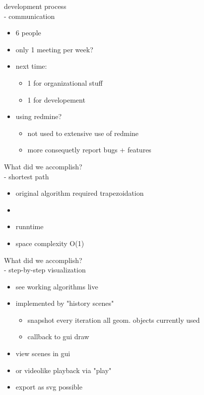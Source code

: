 \documentclass[ucs,9ptb]{beamer}
\begin{document}
\begin{frame}{development process\\- communication}
  \begin{itemize}
    \item 6 people
    \item only 1 meeting per week?
    \item next time:
    \begin{itemize}
      \item 1 for organizational stuff
      \item 1 for developement
    \end{itemize}
    \item using redmine?
    \begin{itemize}
      \item not used to extensive use of redmine
      \item more consequetly report bugs + features
    \end{itemize}
  \end{itemize}
\end{frame}


\begin{frame}{What did we accomplish?\\- shortest path}
  \begin{itemize}
    \item original algorithm required trapezoidation
    \item 
    \item runntime
    \item space complexity O(1)
  \end{itemize}
\end{frame}

\begin{frame}{What did we accomplish?\\- step-by-step visualization}
  \begin{itemize}
    \item see working algorithms live
    \item implemented by "history scenes"
    \begin{itemize}
      \item snapshot every iteration 
            all geom. objects currently used
      \item callback to gui draw
    \end{itemize}
    \item view scenes in gui
    \item or videolike playback via "play"
    \item export as svg possible
  \end{itemize}
\end{frame}
\end{document}
